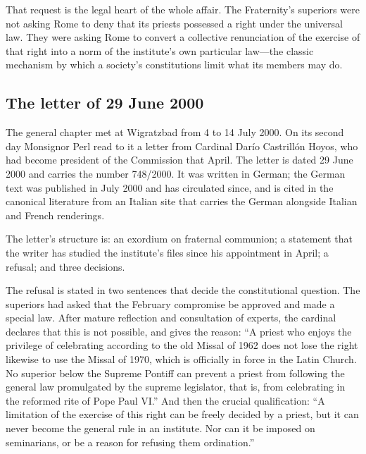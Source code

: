 That request is the legal heart of the whole affair. The Fraternity's
superiors were not asking Rome to deny that its priests possessed a right
under the universal law. They were asking Rome to convert a collective
renunciation of the exercise of that right into a norm of the institute's
own particular law---the classic mechanism by which a society's
constitutions limit what its members may do.

\subsection{The letter of 29 June 2000}

The general chapter met at Wigratzbad from 4 to 14 July 2000. On its
second day Monsignor Perl read to it a letter from Cardinal Darío
Castrillón Hoyos, who had become president of the Commission that April.
The letter is dated 29 June 2000 and carries the number 748/2000. It was
written in German; the German text was published in July 2000 and has
circulated since, and is cited in the canonical literature from an Italian
site that carries the German alongside Italian and French
renderings.

The letter's structure is: an exordium on fraternal communion; a
statement that the writer has studied the institute's files since his
appointment in April; a refusal; and three decisions.

The refusal is stated in two sentences that decide the constitutional
question. The superiors had asked that the February compromise be
approved and made a special law. After mature reflection and consultation
of experts, the cardinal declares that this is not possible, and gives
the reason: ``A priest who enjoys the privilege of celebrating according
to the old Missal of 1962 does not lose the right likewise to use the
Missal of 1970, which is officially in force in the Latin Church. No
superior below the Supreme Pontiff can prevent a priest from following the
general law promulgated by the supreme legislator, that is, from
celebrating in the reformed rite of Pope Paul VI.'' And then the crucial
qualification: ``A limitation of the exercise of this right can be freely
decided by a priest, but it can never become the general rule in an
institute. Nor can it be imposed on seminarians, or be a reason for
refusing them ordination.''

